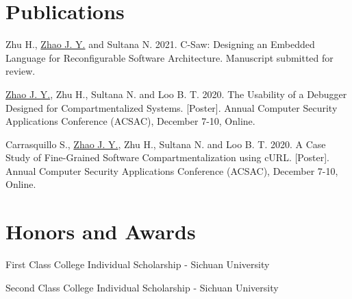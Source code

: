 \documentclass[a4paper]{article}
\begin{document}
\vspace{-5pt}
\section{Publications}
\begin{description}[font=$\bullet$,leftmargin=!]
  \item \small{Zhu H., \underline{Zhao J. Y.} and Sultana N. 2021. C-Saw:
          Designing an Embedded Language for Reconfigurable Software
          Architecture. Manuscript submitted for review.}
  \item \small{\underline{Zhao J. Y.}, Zhu H., Sultana N. and Loo B. T. 2020.
          The Usability of a Debugger Designed for Compartmentalized Systems.
            [Poster]. Annual Computer Security Applications Conference (ACSAC),
          December 7-10, Online.}
  \item \small{Carrasquillo S., \underline{Zhao J. Y.}, Zhu H., Sultana N. and
          Loo B. T. 2020. A Case Study of Fine-Grained Software
          Compartmentalization using cURL. [Poster]. Annual Computer Security
          Applications Conference (ACSAC), December 7-10, Online.}
\end{description}
\vspace{-5pt}

\section{Honors and Awards}
\begin{description}[font=$\bullet$]
  \item {First Class College Individual Scholarship - Sichuan University}
        \vspace{-5pt}
  \item {Second Class College Individual Scholarship - Sichuan University}
        \vspace{-5pt}
\end{description}
\end{document}
